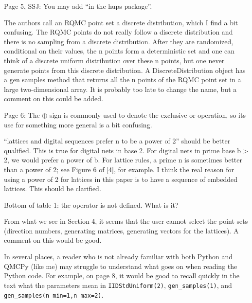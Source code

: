 \documentclass{amsart}
\begin{document}
Page 5, SSJ: You may add “in the hups package”.

\vspace{1cm}

The authors call an RQMC point set a discrete distribution, which I find a bit confusing. The
RQMC points do not really follow a discrete distribution and there is no sampling from a discrete distribution. After they are randomized, conditional on their values, the n points form a deterministic set and one can think of a discrete uniform distribution over these n points, but one never generate points from this discrete distribution. A DiscreteDistribution object has a gen samples method that returns all the n points of the RQMC point set in a
large two-dimensional array. It is probably too late to change the name, but a comment on this could be added.

\vspace{1cm}

Page 6: The $\oplus$ sign is commonly used to denote the exclusive-or operation, so its use for
something more general is a bit confusing.

\vspace{1cm}

``lattices and digital sequences prefer n to be a power of 2'' should be better qualified. This is true for digital nets in base 2. For digital nets in prime base b > 2, we would prefer a power of b. For lattice rules, a prime n is sometimes better than a power of 2; see Figure 6 of [4], for example. I think the real reason for using a power of 2 for lattices in this paper is to have a sequence of embedded lattices. This should be clarified.

\vspace{1cm}

Bottom of table 1: the 	 operator is not defined. What is it?

\vspace{1cm}

From what we see in Section 4, it seems that the user cannot select the point sets (direction numbers, generating matrices, generating vectors for the lattices). A comment on this would be good. 

\vspace{1cm}

In several places, a reader who is not already familiar with both Python and QMCPy (like me) may struggle to understand what goes on when reading the Python code. For example, on page 8, it would be good to recall quickly in the text what the parameters mean in \texttt{IIDStdUniform(2)}, \texttt{gen\_samples(1)}, and \texttt{gen\_samples(n min=1,n max=2)}.
\end{document}
